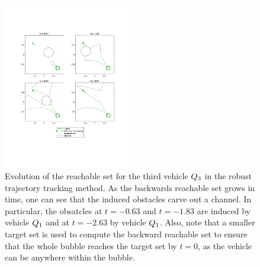 \begin{figure}
  \centering
  \includegraphics[width=0.5\textwidth]{"fig/rtt_rs3"}
  \caption{Evolution of the reachable set for the third vehicle $Q_3$ in the robust trajectory tracking method. As the backwards reachable set grows in time, one can see that the induced obstacles carve out a channel. In particular, the obsatcles at $t =-0.63$ and $t=-1.83$ are induced by vehicle $Q_1$ and at $t =-2.63$ by vehicle $Q_1$. Also, note that a smaller target set is used to compute the backward reachable set to ensure that the whole bubble reaches the target set by $t=0$, as the vehicle can be anywhere within the bubble.}
  \label{fig:rtt_rs3}
\end{figure}